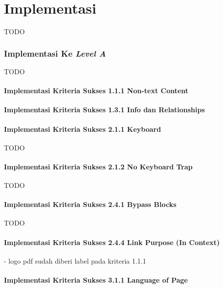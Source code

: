 \chapter{Implementasi}
\label{chap:implementasi}
TODO

\subsection{Implementasi Ke \textit{Level A}}
\label{subsec:implementasi_A}
TODO

\subsubsection{Implementasi Kriteria Sukses 1.1.1 Non-text Content}
\label{subsubsec:implementasi_A_1.1.1}

\subsubsection{Implementasi Kriteria Sukses 1.3.1 Info dan Relationships}
\label{subsubsec:implementasi_A_1.3.1}

\subsubsection{Implementasi Kriteria Sukses 2.1.1 Keyboard}
\label{subsubsec:implementasi_A_2.1.1}
TODO

\subsubsection{Implementasi Kriteria Sukses 2.1.2 No Keyboard Trap}
\label{subsubsec:implementasi_A_2.1.2}
TODO

\subsubsection{Implementasi Kriteria Sukses 2.4.1 Bypass Blocks}
\label{subsubsec:implementasi_A_2.4.1}
TODO

\subsubsection{Implementasi Kriteria Sukses 2.4.4 Link Purpose (In Context)}
\label{subsubsec:implementasi_A_2.4.4}

- logo pdf sudah diberi label pada kriteria 1.1.1

\subsubsection{Implementasi Kriteria Sukses 3.1.1 Language of Page}
\label{subsubsec:implementasi_A_3.1.1}

